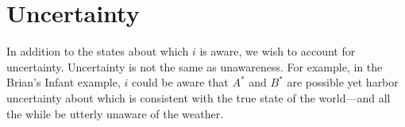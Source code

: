 \documentclass[
11pt,
titlepage,
reqno,
]{article}%
\theoremstyle{definition}
\begin{document}
	
	
	
\section{Uncertainty}
	
In addition to the states about which $i$ is aware, we wish to account for uncertainty. 
Uncertainty is not the same as unawareness.
For example, in the Brian's Infant example, $i$ could be aware that $A^\ast$ and $B^\ast$ are possible yet harbor uncertainty about which is consistent with the true state of the world---and all the while be utterly unaware of the weather.
\end{document}
